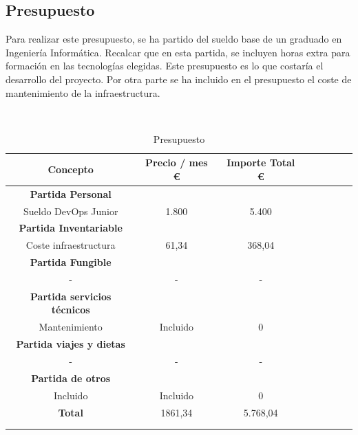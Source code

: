 \subsection{Presupuesto}
        \begin{text}
            Para realizar este presupuesto, se ha partido del sueldo base de un graduado en Ingeniería Informática. Recalcar que en esta partida, se incluyen horas extra para formación en las tecnologías elegidas. Este presupuesto es lo que costaría el desarrollo del proyecto.
            Por otra parte se ha incluido en el presupuesto el coste de mantenimiento de la infraestructura.
        \end{text}
        \\
        \begin{table}[ht]
                \centering
                \begin{tabular}[!hbt]{SSSSSSSS} \toprule
                        {Concepto} &  {Precio / mes \euro} & {Importe Total \euro} \\ \midrule
                        {\textbf{Partida Personal}} \\ \midrule
                        {Sueldo DevOps Junior}  & {1.800} & {5.400}  \\
                    \midrule
                        {\textbf{Partida Inventariable}} \\ \midrule
                        {Coste infraestructura}  & {61,34}  & {368,04}   \\
                        \midrule
                        {\textbf{Partida Fungible}} \\ \midrule
                        {-}  & {-}  & {-}   \\
                        \midrule
                        {\textbf{Partida servicios técnicos}} \\ \midrule
                        {Mantenimiento}  & {Incluido}  & {0} \\
                        \midrule
                        {\textbf{Partida viajes y dietas}} \\ \midrule
                        {-}  & {-}  & {-} \\
                        \midrule
                        {\textbf{Partida de otros}} \\ \midrule
                        {Incluido}  & {Incluido}  & {0} \\
                        \midrule
                        {\textbf{Total}}  & {1861,34}  & {5.768,04} \\
                        \\ \midrule
                 \\ \bottomrule
                \end{tabular}
                \caption[Presupuesto]{Presupuesto \cite{presupuesto:online}} 
                \label{Presupuesto}
        \end{table}


